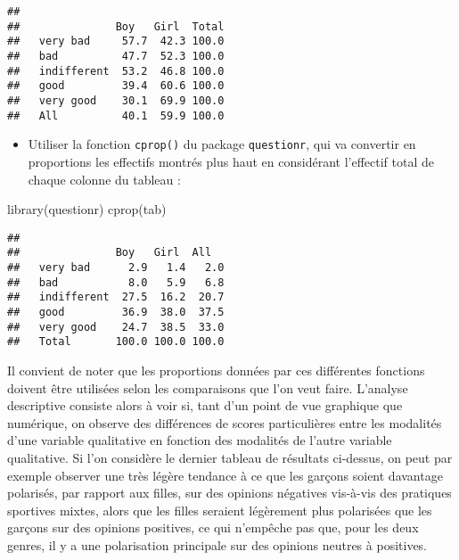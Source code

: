 \documentclass[
]{book}
\newenvironment{Shaded}{\begin{snugshade}}{\end{snugshade}}
\newcommand{\FunctionTok}[1]{\textcolor[rgb]{0.00,0.00,0.00}{#1}}
\newcommand{\NormalTok}[1]{#1}
\providecommand{\tightlist}{%
  \setlength{\itemsep}{0pt}\setlength{\parskip}{0pt}}
\begin{document}
\begin{verbatim}
##              
##               Boy   Girl  Total
##   very bad     57.7  42.3 100.0
##   bad          47.7  52.3 100.0
##   indifferent  53.2  46.8 100.0
##   good         39.4  60.6 100.0
##   very good    30.1  69.9 100.0
##   All          40.1  59.9 100.0
\end{verbatim}

\begin{itemize}
\tightlist
\item
  Utiliser la fonction \texttt{cprop()} du package \texttt{questionr}, qui va convertir en proportions les effectifs montrés plus haut en considérant l'effectif total de chaque colonne du tableau :
\end{itemize}

\begin{Shaded}
\begin{Highlighting}[]
\FunctionTok{library}\NormalTok{(questionr)}
\FunctionTok{cprop}\NormalTok{(tab)}
\end{Highlighting}
\end{Shaded}

\begin{verbatim}
##              
##               Boy   Girl  All  
##   very bad      2.9   1.4   2.0
##   bad           8.0   5.9   6.8
##   indifferent  27.5  16.2  20.7
##   good         36.9  38.0  37.5
##   very good    24.7  38.5  33.0
##   Total       100.0 100.0 100.0
\end{verbatim}

Il convient de noter que les proportions données par ces différentes fonctions doivent être utilisées selon les comparaisons que l'on veut faire. L'analyse descriptive consiste alors à voir si, tant d'un point de vue graphique que numérique, on observe des différences de scores particulières entre les modalités d'une variable qualitative en fonction des modalités de l'autre variable qualitative. Si l'on considère le dernier tableau de résultats ci-dessus, on peut par exemple observer une très légère tendance à ce que les garçons soient davantage polarisés, par rapport aux filles, sur des opinions négatives vis-à-vis des pratiques sportives mixtes, alors que les filles seraient légèrement plus polarisées que les garçons sur des opinions positives, ce qui n'empêche pas que, pour les deux genres, il y a une polarisation principale sur des opinions neutres à positives.
\end{document}
